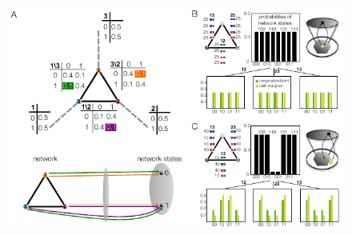 \documentclass[10pt]{article}
\providecommand{\DIFdelendFL}{} %
\begin{document}
\begin{figure}[!ht]
\DIFdelendFL \includegraphics[width=0.9\columnwidth]{fig/inconsistentthreecycle.pdf}

\end{figure}
\end{document}
